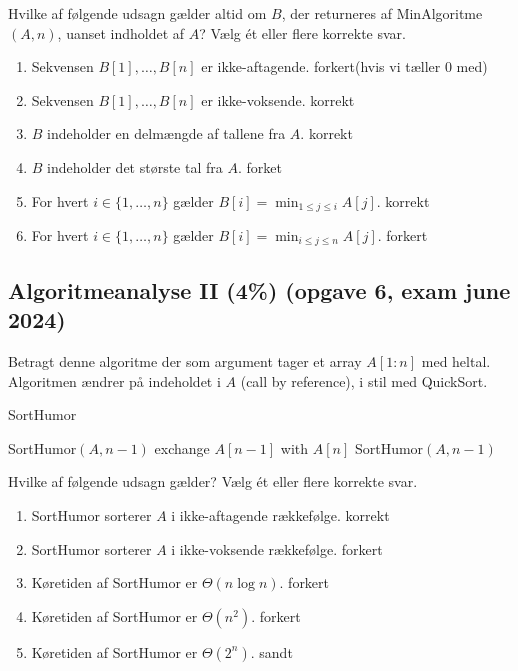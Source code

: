 \documentclass{article}
\theoremstyle{definition}
\begin{document}
Hvilke af følgende udsagn gælder altid om $B$, der returneres af MinAlgoritme$(A,n)$, uanset indholdet af $A$? Vælg ét eller flere korrekte svar.

\begin{enumerate}
    \item Sekvensen $B[1],\ldots,B[n]$ er ikke-aftagende. forkert(hvis vi tæller 0 med)
    \item Sekvensen $B[1],\ldots,B[n]$ er ikke-voksende. korrekt
    \item $B$ indeholder en delmængde af tallene fra $A$. korrekt
    \item $B$ indeholder det største tal fra $A$. forket
    \item For hvert $i \in \{1,\ldots,n\}$ gælder $B[i] = \min_{1\leq j\leq i} A[j]$. korrekt
    \item For hvert $i \in \{1,\ldots,n\}$ gælder $B[i] = \min_{i\leq j\leq n} A[j]$. forkert
\end{enumerate}

\subsection{Algoritmeanalyse II (4\%) (opgave 6, exam june 2024)}
Betragt denne algoritme der som argument tager et array $A[1:n]$ med heltal. Algoritmen ændrer på indeholdet i $A$ (call by reference), i stil med QuickSort.

\begin{algorithm}
\caption{SortHumor}
\begin{algorithmic}[1]
    \State SortHumor$(A, n-1)$
        \State exchange $A[n-1]$ with $A[n]$
    \EndIf
    \State SortHumor$(A, n-1)$
\EndIf
\end{algorithmic}
\end{algorithm}

Hvilke af følgende udsagn gælder? Vælg ét eller flere korrekte svar.
\begin{enumerate}
    \item SortHumor sorterer $A$ i ikke-aftagende rækkefølge. korrekt
    \item SortHumor sorterer $A$ i ikke-voksende rækkefølge. forkert
    \item Køretiden af SortHumor er $\Theta(n\log n)$. forkert 
    \item Køretiden af SortHumor er $\Theta(n^2)$. forkert
    \item Køretiden af SortHumor er $\Theta(2^n)$. sandt
\end{enumerate}
\end{document}
